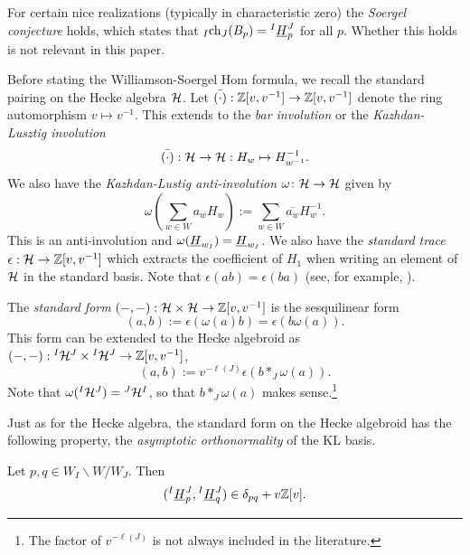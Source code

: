 \begin{remark} For certain nice realizations (typically in characteristic zero) the \emph{Soergel conjecture} holds, which states that ${}_{I}{\operatorname{ch}}_{J}(B_p) = {}^I\underline{H}^J_p$ for all $p$. Whether this holds is not relevant in this paper.
\end{remark}

Before stating the Williamson-Soergel Hom formula, we recall the standard pairing on the Hecke algebra $\mathcal{H}$.
Let $\bar{( \cdot)}: \mathbb{Z}[v,v^{-1}] \rightarrow \mathbb{Z}[v, v^{-1}]$ denote the ring automorphism $v \mapsto v^{-1}$. 
This extends to the \emph{bar involution} or the \emph{Kazhdan-Lusztig involution} 
$$\bar{(\cdot)}: \mathcal{H} \rightarrow \mathcal{H}: H_w \mapsto H_{w^{-1}}^{-1}.$$
We also have the \emph{Kazhdan-Lustig anti-involution} $\omega\colon \mathcal{H}\to \mathcal{H}$  given by 
$$\omega(\sum_{w\in W}a_{w}H_{w}) := \sum_{w\in W}\overline{a_{w}}H_{w}^{-1}.$$
This is an anti-involution and $\omega(\underline{H}_{w_I}) = \underline{H}_{w_{I}}$.
We also have the \emph{standard trace} $\epsilon: \mathcal{H} \rightarrow \mathbb{Z}[v,v^{-1}]$ which extracts the coefficient of $H_1$ when writing an element of $\mathcal{H}$ in the standard basis. 
Note that $\epsilon(ab)=\epsilon(ba)$ (see, for example, \cite[Corollary 3.17]{EMTW}).
\begin{defn}\label{defn-standard form}
    The \emph{standard form} $(-,-):\mathcal{H} \times \mathcal{H} \rightarrow \mathbb{Z}[v,v^{-1}]$ is the sesquilinear form 
    $$(a,b):=\epsilon(\omega(a)b) = \epsilon(b\omega(a)).$$
    This form can be extended to the Hecke algebroid as $(-,-):{}^{I}\mathcal{H}^{J} \times {}^{I}\mathcal{H}^{J} \rightarrow \mathbb{Z}[v,v^{-1}]$, \begin{equation} (a,b):= v^{-\ell(J)}\epsilon(b*_J\omega(a)).\end{equation} Note that $\omega({}^{I}\mathcal{H}^{J}) = {}^{J}\mathcal{H}^{I}$, so that $b *_J \omega(a)$ makes sense.\footnote{The factor of $v^{-\ell(J)}$ is not always included in the literature.}
\end{defn}

Just as for the Hecke algebra, the standard form on the Hecke algebroid has the following property, the \emph{asymptotic orthonormality} of the KL basis.

\begin{lemma} \label{lem:ortho} Let $p, q \in W_I \backslash W/W_J$. Then
\begin{equation} ({}^{I}\underline{H}^{J}_{p}, {}^{I}\underline{H}^{J}_{q}) \in \delta_{pq} + v \mathbb{Z}[v]. \end{equation}
\end{lemma}

